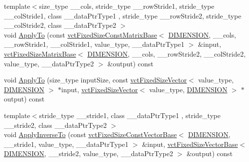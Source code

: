 \begin{DoxyCompactItemize}
{\footnotesize template$<$size\+\_\+type \+\_\+\+\_\+cols, stride\+\_\+type \+\_\+\+\_\+row\+Stride1, stride\+\_\+type \+\_\+\+\_\+col\+Stride1, class \+\_\+\+\_\+data\+Ptr\+Type1 , stride\+\_\+type \+\_\+\+\_\+row\+Stride2, stride\+\_\+type \+\_\+\+\_\+col\+Stride2, class \+\_\+\+\_\+data\+Ptr\+Type2 $>$ }\\void \hyperlink{classvct_frame4x4_const_base_a531221401fe4915c612f603b16d823ea}{Apply\+To} (const \hyperlink{classvct_fixed_size_const_matrix_base}{vct\+Fixed\+Size\+Const\+Matrix\+Base}$<$ \hyperlink{classvct_frame4x4_const_base_aa9000d4539e9ab27b091692d4bd0d986a97d7212e6c46dc9acbbd11bbc573d9a0}{D\+I\+M\+E\+N\+S\+I\+O\+N}, \+\_\+\+\_\+cols, \+\_\+\+\_\+row\+Stride1, \+\_\+\+\_\+col\+Stride1, value\+\_\+type, \+\_\+\+\_\+data\+Ptr\+Type1 $>$ \&input, \hyperlink{classvct_fixed_size_matrix_base}{vct\+Fixed\+Size\+Matrix\+Base}$<$ \hyperlink{classvct_frame4x4_const_base_aa9000d4539e9ab27b091692d4bd0d986a97d7212e6c46dc9acbbd11bbc573d9a0}{D\+I\+M\+E\+N\+S\+I\+O\+N}, \+\_\+\+\_\+cols, \+\_\+\+\_\+row\+Stride2, \+\_\+\+\_\+col\+Stride2, value\+\_\+type, \+\_\+\+\_\+data\+Ptr\+Type2 $>$ \&output) const 
\item 
void \hyperlink{classvct_frame4x4_const_base_a9c563b3b4d4b716dd264394d81c2522e}{Apply\+To} (size\+\_\+type input\+Size, const \hyperlink{classvct_fixed_size_vector}{vct\+Fixed\+Size\+Vector}$<$ value\+\_\+type, \hyperlink{classvct_frame4x4_const_base_aa9000d4539e9ab27b091692d4bd0d986a97d7212e6c46dc9acbbd11bbc573d9a0}{D\+I\+M\+E\+N\+S\+I\+O\+N} $>$ $\ast$input, \hyperlink{classvct_fixed_size_vector}{vct\+Fixed\+Size\+Vector}$<$ value\+\_\+type, \hyperlink{classvct_frame4x4_const_base_aa9000d4539e9ab27b091692d4bd0d986a97d7212e6c46dc9acbbd11bbc573d9a0}{D\+I\+M\+E\+N\+S\+I\+O\+N} $>$ $\ast$output) const 
\item 
{\footnotesize template$<$stride\+\_\+type \+\_\+\+\_\+stride1, class \+\_\+\+\_\+data\+Ptr\+Type1 , stride\+\_\+type \+\_\+\+\_\+stride2, class \+\_\+\+\_\+data\+Ptr\+Type2 $>$ }\\void \hyperlink{classvct_frame4x4_const_base_a39519237ffc72ee662e767461b66b1da}{Apply\+Inverse\+To} (const \hyperlink{classvct_fixed_size_const_vector_base}{vct\+Fixed\+Size\+Const\+Vector\+Base}$<$ \hyperlink{classvct_frame4x4_const_base_aa9000d4539e9ab27b091692d4bd0d986a97d7212e6c46dc9acbbd11bbc573d9a0}{D\+I\+M\+E\+N\+S\+I\+O\+N}, \+\_\+\+\_\+stride1, value\+\_\+type, \+\_\+\+\_\+data\+Ptr\+Type1 $>$ \&input, \hyperlink{classvct_fixed_size_vector_base}{vct\+Fixed\+Size\+Vector\+Base}$<$ \hyperlink{classvct_frame4x4_const_base_aa9000d4539e9ab27b091692d4bd0d986a97d7212e6c46dc9acbbd11bbc573d9a0}{D\+I\+M\+E\+N\+S\+I\+O\+N}, \+\_\+\+\_\+stride2, value\+\_\+type, \+\_\+\+\_\+data\+Ptr\+Type2 $>$ \&output) const 

\end{DoxyCompactItemize}
